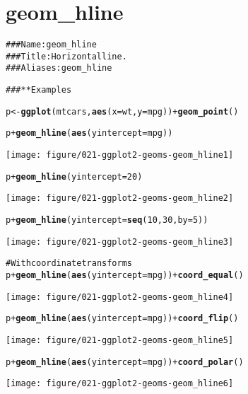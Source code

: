 \documentclass[a4paper,titlepage]{tufte-handout}\usepackage{graphicx, color}
\makeatletter
\def\maxwidth{ %
  \ifdim\Gin@nat@width>\linewidth
    \linewidth
  \else
    \Gin@nat@width
  \fi
}
\newcommand{\hlfunctioncall}[1]{\textcolor[rgb]{0.501960784313725,0,0.329411764705882}{\textbf{#1}}}%
\newcommand{\hlcomment}[1]{\textcolor[rgb]{0.180392156862745,0.6,0.341176470588235}{#1}}%
\newenvironment{kframe}{%
 \def\at@end@of@kframe{}%
 \ifinner\ifhmode%
  \def\at@end@of@kframe{\end{minipage}}%
  \begin{minipage}{\columnwidth}%
 \fi\fi%
 \def\FrameCommand##1{\hskip\@totalleftmargin \hskip-\fboxsep
 \colorbox{shadecolor}{##1}\hskip-\fboxsep
     \hskip-\linewidth \hskip-\@totalleftmargin \hskip\columnwidth}%
 \MakeFramed {\advance\hsize-\width
   \@totalleftmargin\z@ \linewidth\hsize
   \@setminipage}}%
 {\par\unskip\endMakeFramed%
 \at@end@of@kframe}
\newenvironment{knitrout}{}{} %
\makeatother
\begin{document}
\section{geom\_hline}

\begin{knitrout}
\color{fgcolor}\begin{kframe}
\begin{alltt}
\hlcomment{### Name: geom_hline}
\hlcomment{### Title: Horizontal line.}
\hlcomment{### Aliases: geom_hline}

\hlcomment{### ** Examples}

p <- \hlfunctioncall{ggplot}(mtcars, \hlfunctioncall{aes}(x = wt, y=mpg)) + \hlfunctioncall{geom_point}()

p + \hlfunctioncall{geom_hline}(\hlfunctioncall{aes}(yintercept=mpg))
\end{alltt}
\end{kframe}
\texttt{[image: figure/021-ggplot2-geoms-geom\_hline1]} 
\begin{kframe}\begin{alltt}
p + \hlfunctioncall{geom_hline}(yintercept=20)
\end{alltt}
\end{kframe}
\texttt{[image: figure/021-ggplot2-geoms-geom\_hline2]} 
\begin{kframe}\begin{alltt}
p + \hlfunctioncall{geom_hline}(yintercept=\hlfunctioncall{seq}(10, 30, by=5))
\end{alltt}
\end{kframe}
\texttt{[image: figure/021-ggplot2-geoms-geom\_hline3]} 
\begin{kframe}\begin{alltt}

\hlcomment{# With coordinate transforms}
p + \hlfunctioncall{geom_hline}(\hlfunctioncall{aes}(yintercept=mpg)) + \hlfunctioncall{coord_equal}()
\end{alltt}
\end{kframe}
\texttt{[image: figure/021-ggplot2-geoms-geom\_hline4]} 
\begin{kframe}\begin{alltt}
p + \hlfunctioncall{geom_hline}(\hlfunctioncall{aes}(yintercept=mpg)) + \hlfunctioncall{coord_flip}()
\end{alltt}
\end{kframe}
\texttt{[image: figure/021-ggplot2-geoms-geom\_hline5]} 
\begin{kframe}\begin{alltt}
p + \hlfunctioncall{geom_hline}(\hlfunctioncall{aes}(yintercept=mpg)) + \hlfunctioncall{coord_polar}()
\end{alltt}
\end{kframe}
\texttt{[image: figure/021-ggplot2-geoms-geom\_hline6]} 
\begin{kframe}\begin{alltt}


\end{alltt}
\end{kframe}
\end{knitrout}
\end{document}
